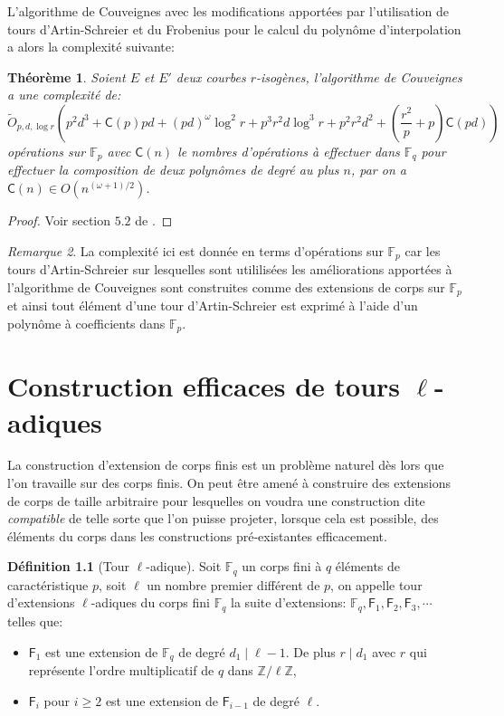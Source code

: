 \documentclass[10pt,a4paper]{book}
\theoremstyle{plain}
\newtheorem{thm}{Théorème}[chapter]
\theoremstyle{definition}
\theoremstyle{definition}
\theoremstyle{definition}
\theoremstyle{definition}
\newtheorem{defi}[thm]{Définition}
\theoremstyle{remark}
\newtheorem{rem}[thm]{Remarque}
\theoremstyle{remark}
\theoremstyle{definition}
\begin{document}
L'algorithme de Couveignes avec les modifications apportées par l'utilisation de tours d'Artin-Schreier et du Frobenius pour le calcul du polynôme d'interpolation a alors la complexité suivante:

\begin{thm}
Soient $E$ et $E'$ deux courbes $r$-isogènes, l'algorithme de Couveignes a une complexité de:
\[
\tilde{O}_{p,d,\log r}(p^2d^3+\mathsf{C}(p)pd+(pd)^{\omega}\log^2 r + p^3 r^2 d \log^3 r + p^2r^2d^2+(\frac{r^2}{p}+p)\mathsf{C}(pd))
\]
opérations sur $\mathbb{F}_p$ avec $\mathsf{C}(n)$ le nombres d'opérations à effectuer dans $\mathbb{F}_q$ pour effectuer la composition de deux polynômes de degré au plus $n$, par \cite{BrentKung78} on a $\mathsf{C}(n) \in O(n^{(\omega+1)/2})$.
\end{thm}

\begin{proof}
Voir section $5.2$ de \cite{DeFeo11}.
\end{proof}

\begin{rem}
La complexité ici est donnée en terms d'opérations sur $\mathbb{F}_p$ car les 
tours d'Artin-Schreier sur lesquelles sont utililisées les améliorations 
apportées à l'algorithme de Couveignes sont construites comme des extensions de
corps sur $\mathbb{F}_p$ et ainsi tout élément d'une tour d'Artin-Schreier est
exprimé à l'aide d'un polynôme à coefficients dans $\mathbb{F}_p$.
\end{rem}

\chapter{Construction efficaces de tours $\ell$-adiques}
\label{cha:tour}
La construction d'extension de corps finis est un problème naturel dès lors que l'on travaille sur des corps finis. On peut être amené à construire des extensions de corps de taille arbitraire pour lesquelles on voudra une construction dite \textit{compatible} de telle sorte que l'on puisse projeter, lorsque cela est possible, des éléments du corps dans les constructions pré-existantes efficacement.

\begin{defi}[Tour \textit{$\ell$}-adique]
\label{def:tour-ell}
Soit $\mathbb{F}_q$ un corps fini à $q$ éléments de caractéristique $p$, soit $\ell$ un nombre premier différent de $p$, on appelle tour d'extensions $\ell$-adiques du corps fini $\mathbb{F}_q$ la suite d'extensions: $\mathbb{F}_q, \mathsf{F}_{1}, \mathsf{F}_{2}, \mathsf{F}_{3}, \cdots$ telles que:
\begin{itemize}
\item $\mathsf{F}_{1}$ est une extension de $\mathbb{F}_q$ de degré $d_1 \mid \ell-1$. De plus $r \mid d_1$ avec $r$ qui représente l'ordre multiplicatif de $q$ dans $\mathbb{Z}/\ell \mathbb{Z}$,
\item $\mathsf{F}_{i}$ pour $i \geqslant 2$ est une extension de $\mathsf{F}_{i-1}$ de degré $\ell$.
\end{itemize}
\end{defi}
\end{document}
